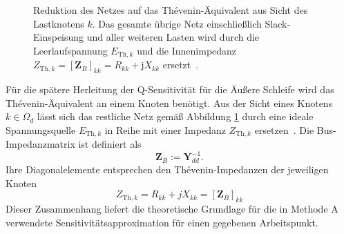 \begin{figure}[htbp]
{\begin{tikzpicture}
	\end{tikzpicture}
	}
	\caption[Th\'evenin-\"Aquivalent an einem Lastknoten]{Reduktion des Netzes auf
		das Th\'evenin-\"Aquivalent aus Sicht des Lastknotens $k$. Das gesamte
		\"ubrige Netz einschlie{\ss}lich Slack-Einspeisung und aller weiteren Lasten
		wird durch die Leerlaufspannung $E_{\mathrm{Th},k}$ und die Innenimpedanz
		$Z_{\mathrm{Th},k}=[\mathbf{Z}_B]_{kk}=R_{kk}+\mathrm{j}X_{kk}$
		ersetzt~\cite{Grainger1994,Anderson1995,Dorfler2013}.}
	\label{fig:thevenin}
\end{figure}

Für die spätere Herleitung der Q-Sensitivität für die Äußere Schleife wird das Thévenin-Äquivalent an einem Knoten benötigt. Aus der Sicht eines Knotens $k \in \Omega_d$ lässt sich das restliche Netz gemäß Abbildung \ref{fig:thevenin} durch eine ideale Spannungsquelle $E_{\text{Th},k}$ in Reihe mit einer Impedanz $Z_{\text{Th},k}$ ersetzen~\cite{osipov2022}.
Die Bus-Impedanzmatrix ist definiert als
\begin{equation}
	\label{eq:zbus}
	\mathbf{Z}_B := \mathbf{Y}_{dd}^{-1}.
\end{equation}
Ihre Diagonalelemente entsprechen den Thévenin-Impedanzen der jeweiligen Knoten \cite{Giraldo2022,ALDAOUDEYEH2019105890}
\begin{equation}
	\label{eq:z_thev}
	Z_{\text{Th},k} = R_{kk} + jX_{kk} = [\mathbf{Z}_B]_{kk}
\end{equation}
Dieser Zusammenhang liefert die theoretische Grundlage für die in Methode A verwendete Sensitivitätsapproximation für einen gegebenen Arbeitspunkt.


